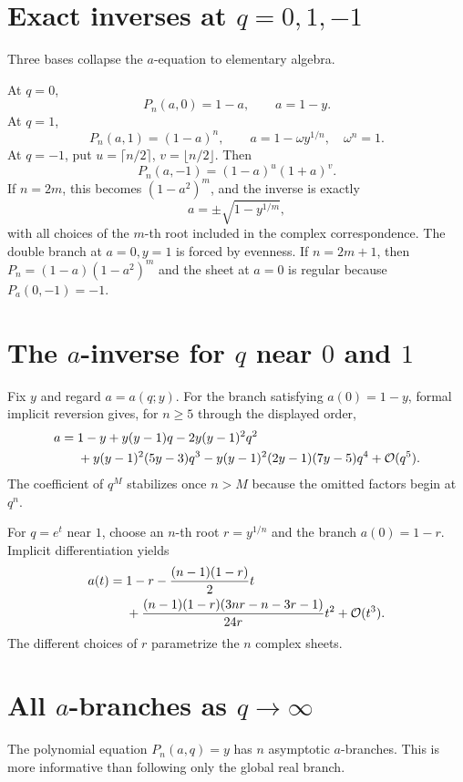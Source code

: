 \documentclass[11pt,oneside]{book}
\theoremstyle{definition}
\theoremstyle{remark}
\newcommand{\OO}{\mathcal{O}}
\begin{document}
\section{Exact inverses at $q=0,1,-1$}
Three bases collapse the $a$-equation to elementary algebra.

At $q=0$,
\[
 P_n(a,0)=1-a,
 \qquad a=1-y.
\]
At $q=1$,
\[
 P_n(a,1)=(1-a)^n,
 \qquad a=1-\omega y^{1/n},\quad \omega^n=1.
\]
At $q=-1$, put $u=\lceil n/2\rceil$, $v=\lfloor n/2\rfloor$.  Then
\begin{equation}\label{eq:finite-at-minus-one}
 P_n(a,-1)=(1-a)^u(1+a)^v.
\end{equation}
If $n=2m$, this becomes $(1-a^2)^m$, and the inverse is exactly
\[
 a=\pm\sqrt{1-y^{1/m}},
\]
with all choices of the $m$-th root included in the complex correspondence.
The double branch at $a=0,y=1$ is forced by evenness.  If $n=2m+1$, then
$P_n=(1-a)(1-a^2)^m$ and the sheet at $a=0$ is regular because
$P_a(0,-1)=-1$.

\section{The $a$-inverse for $q$ near $0$ and $1$}
Fix $y$ and regard $a=a(q;y)$.  For the branch satisfying $a(0)=1-y$,
formal implicit reversion gives, for $n\ge5$ through the displayed order,
\begin{align}
 a={}&1-y+y(y-1)q-2y(y-1)^2q^2 \notag\\
 &+y(y-1)^2(5y-3)q^3
 -y(y-1)^2(2y-1)(7y-5)q^4+\OO(q^5).
 \label{eq:a-inverse-q-zero}
\end{align}
The coefficient of $q^M$ stabilizes once $n>M$ because the omitted factors
begin at $q^n$.

For $q=e^t$ near $1$, choose an $n$-th root $r=y^{1/n}$ and the branch
$a(0)=1-r$.  Implicit differentiation yields
\begin{align}
 a(t)={}&1-r-\frac{(n-1)(1-r)}2t\notag\\
 &+\frac{(n-1)(1-r)(3nr-n-3r-1)}{24r}t^2
 +\OO(t^3).\label{eq:a-near-q-one-finite}
\end{align}
The different choices of $r$ parametrize the $n$ complex sheets.

\section{All $a$-branches as $q\to\infty$}
The polynomial equation $P_n(a,q)=y$ has $n$ asymptotic $a$-branches.  This
is more informative than following only the global real branch.
\end{document}
